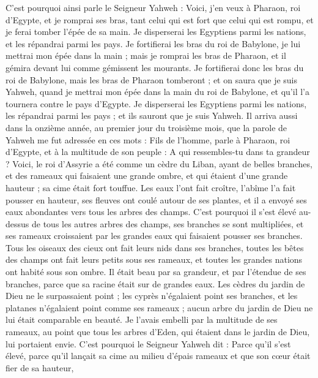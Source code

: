 \begin{multicols}{2}
C'est pourquoi ainsi parle le Seigneur Yahweh : Voici, j'en veux à Pharaon, roi d'Egypte, et je romprai ses bras, tant celui qui est fort que celui qui est rompu, et je ferai tomber l'épée de sa main.
Je disperserai les Egyptiens parmi les nations, et les répandrai parmi les pays.
Je fortifierai les bras du roi de Babylone, je lui mettrai mon épée dans la main ; mais je romprai les bras de Pharaon, et il gémira devant lui comme gémissent les mourants.
Je fortifierai donc les bras du roi de Babylone, mais les bras de Pharaon tomberont ; et on saura que je suis Yahweh, quand je mettrai mon épée dans la main du roi de Babylone, et qu'il l'a tournera contre le pays d'Egypte.
Je disperserai les Egyptiens parmi les nations, les répandrai parmi les pays ; et ils sauront que je suis Yahweh.
\VerseOne{}Il arriva aussi dans la onzième année, au premier jour du troisième mois, que la parole de Yahweh me fut adressée en ces mots :
Fils de l'homme, parle à Pharaon, roi d'Egypte, et à la multitude de son peuple : A qui ressembles-tu dans ta grandeur ?
Voici, le roi d'Assyrie a été comme un cèdre du Liban, ayant de belles branches, et des rameaux qui faisaient une grande ombre, et qui étaient d'une grande hauteur ; sa cime était fort touffue.
Les eaux l'ont fait croître, l'abîme l'a fait pousser en hauteur, ses fleuves ont coulé autour de ses plantes, et il a envoyé ses eaux abondantes vers tous les arbres des champs.
C'est pourquoi il s'est élevé au-dessus de tous les autres arbres des champs, ses branches se sont multipliées, et ses rameaux croissaient par les grandes eaux qui faisaient pousser ses branches.
Tous les oiseaux des cieux ont fait leurs nids dans ses branches, toutes les bêtes des champs ont fait leurs petits sous ses rameaux, et toutes les grandes nations ont habité sous son ombre.
Il était beau par sa grandeur, et par l'étendue de ses branches, parce que sa racine était sur de grandes eaux.
Les cèdres du jardin de Dieu ne le surpassaient point ; les cyprès n'égalaient point ses branches, et les platanes n'égalaient point comme ses rameaux ; aucun arbre du jardin de Dieu ne lui était comparable en beauté.
Je l'avais embelli par la multitude de ses rameaux, au point que tous les arbres d'Eden, qui étaient dans le jardin de Dieu, lui portaient envie.
C'est pourquoi le Seigneur Yahweh dit : Parce qu'il s'est élevé, parce qu'il lançait sa cime au milieu d'épais rameaux et que son cœur était fier de sa hauteur,

\end{multicols}
